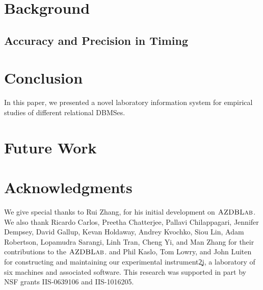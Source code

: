 \documentclass[times]{speauth}
\def\azdblab{\mbox{{\sc AZDBLab}}}
\begin{document}
\section{Background}\label{sec:background}

\subsection{Accuracy and Precision in Timing}\label{sec:prec_accuracy}

\section{Conclusion}
In this paper, we presented a novel laboratory information system 
for empirical studies of different relational DBMSes.

\section{Future Work}\label{sec:future_work}

\section{Acknowledgments}
We give special thanks to Rui Zhang, for his initial development on $\azdblab$. 
We also thank Ricardo Carlos, Preetha Chatterjee, Pallavi
Chilappagari, Jennifer Dempsey, David Gallup, Kevan Holdaway, Andrey
Kvochko, Siou Lin, Adam Robertson, Lopamudra Sarangi, Linh Tran, Cheng Yi, and Man Zhang for
their contributions to the $\azdblab$. and Phil Kaslo, Tom Lowry, and John
Luiten for constructing and maintaining our experimental instrument\c2j{}{,
  a laboratory of six machines and associated software}. 
This research was supported in part by NSF grants \hbox{IIS-0639106} and \hbox{IIS-1016205}.


%
\end{document}
